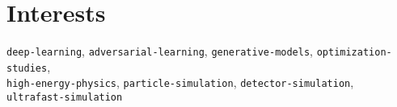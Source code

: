 \section*{Interests}
\begin{cvcontent}
  \texttt{deep-learning},
  \texttt{adversarial-learning},
  \texttt{generative-models},
  \texttt{optimization-studies},\\
  \texttt{high-energy-physics},
  \texttt{particle-simulation},
  \texttt{detector-simulation},
  \texttt{ultrafast-simulation}
\end{cvcontent}